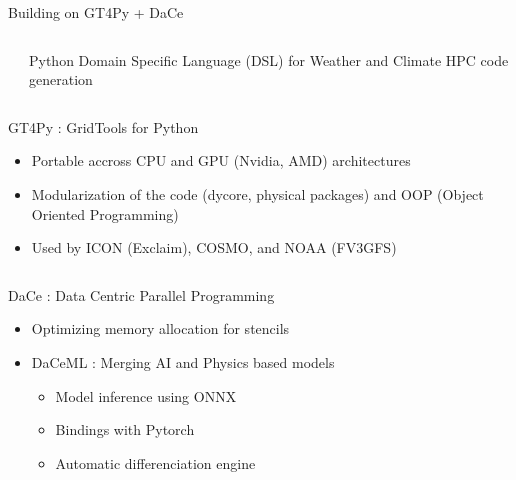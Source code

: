\documentclass[10pt]{beamer}
\begin{document}
\begin{frame}{Building on GT4Py + DaCe}


    \begin{columns}[t]
        \begin{column}{0.3\textwidth}
        \end{column}

       \begin{column}{0.7\textwidth}
                \small Python Domain Specific Language (DSL) for Weather and Climate HPC code generation        
        \end{column}
    \end{columns}

    \vspace{0.2cm}

        \begin{block}{GT4Py : GridTools for Python}
            \begin{itemize}
                \item[\faPlus] \small Portable accross CPU and GPU (Nvidia, AMD) architectures
                \item[\faPlus] \small Modularization of the code (dycore, physical packages) and OOP (Object Oriented Programming)
                \item[\faPlus] \small Used by ICON (Exclaim), COSMO, and NOAA (FV3GFS) 
            \end{itemize}    
        \end{block}

    \begin{columns}[t]
        
    
        \begin{column}{0.7\textwidth}
            \begin{block}{\small DaCe : Data Centric Parallel Programming}
                \begin{itemize}
                    \item \small Optimizing memory allocation for stencils
                    \item \small DaCeML : Merging AI and Physics based models
                    \begin{itemize}
                        \item \small Model inference using ONNX 
                        \item \small Bindings with Pytorch
                        \item \small Automatic differenciation engine
                    \end{itemize}
                \end{itemize}
            \end{block}        
        \end{column}


\end{columns}
\end{frame}
\end{document}
